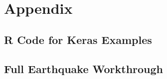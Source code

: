 \appendix

\chapter{Appendix}

\section{R Code for Keras Examples}



\section{Full Earthquake Workthrough}

 